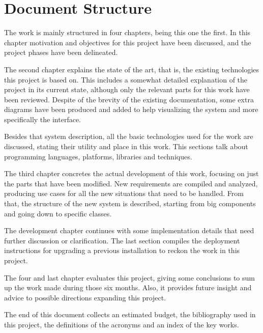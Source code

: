 \section{Document Structure} %
\label{sec:structure}

The work is mainly structured in four chapters, being this one the first.
In this chapter motivation and objectives for this project have been discussed, and the project phases have been delineated.

The second chapter explains the state of the art, that is, the existing technologies this project is based on.
This includes a somewhat detailed explanation of the  project in its current state, although only the relevant parts for this work have been reviewed.
Despite of the brevity of the existing documentation, some extra diagrams have been produced and added to help visualizing the system and more specifically the  interface.

Besides that system description, all the basic technologies used for the work are discussed, stating their utility and place in this work.
This sections talk about programming languages, platforms, libraries and techniques.

The third chapter concretes the actual development of this work, focusing on just the parts that have been modified.
New requirements are compiled and analyzed, producing use cases for all the new situations that need to be handled.
From that, the structure of the new system is described, starting from big components and going down to specific classes.

The development chapter continues with some implementation details that need further discussion or clarification.
The last section compiles the deployment instructions for upgrading a previous  installation to reckon the work in this project.

The four and last chapter evaluates this project, giving some conclusions to sum up the work made during those six months.
Also, it provides future insight and advice to possible directions expanding this project.

The end of this document collects an estimated budget, the bibliography used in this project, the definitions of the acronyms and an index of the key works.
